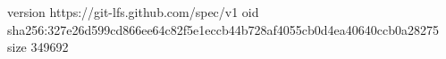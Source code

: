 version https://git-lfs.github.com/spec/v1
oid sha256:327e26d599cd866ee64c82f5e1eccb44b728af4055cb0d4ea40640ccb0a28275
size 349692
